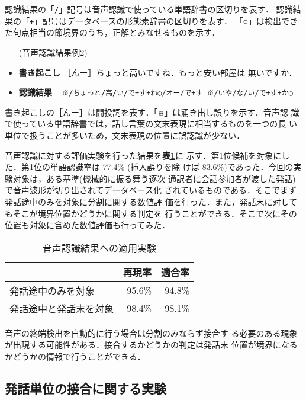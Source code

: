 認識結果の「{\tt /}」記号は音声認識で使っている単語辞書の区切りを表す．
認識結果の「{\tt +}」記号はデータベースの形態素辞書の区切りを表す．
「○」は検出できた句点相当の節境界のうち，正解とみなせるものを示す．

\begin{itemize}
\item[(音声認識結果例2)]
\item {\bf\dg 書き起こし} ［んー］ちょっと高いですね．もっと安い部屋は
無いですか．
\item {\bf\dg 認識結果} {\tt 二※/ちょっと/高/い/で+す+ね○/オー/で+す
※/いや/な/い/で+す+か○}
\end{itemize}

書き起こしの［んー］は間投詞を表す．「※」は涌き出し誤りを示す．音声認
識で使っている単語辞書では，話し言葉の文末表現に相当するものを一つの長
い単位で扱うことが多いため，文末表現の位置に誤認識が少ない．

音声認識に対する評価実験を行った結果を{\bf\dg 表\ref{t:recognition}}に
示す．第1位候補を対象にした．第1位の単語認識率は 77.4\% (挿入誤りを除
けば 83.6\%)であった．今回の実験対象は，ある基準(機械的に振る舞う逐次
通訳者に会話参加者が渡した発話)で音声波形が切り出されてデータベース化
されているものである．そこでまず発話途中のみを対象に分割に関する数値評
価を行った．また，発話末に対してもそこが境界位置かどうかに関する判定を
行うことができる．そこで次にその位置も対象に含めた数値評価も行ってみた．

\begin{table}
\caption{音声認識結果への適用実験}\label{t:recognition}
\begin{center}
\begin{tabular}{|l||r|r|}
\hline
 & \multicolumn{1}{c|}{再現率} & \multicolumn{1}{c|}{適合率} \\
\hline\hline
発話途中のみを対象     & 95.6\% & 94.8\% \\
\hline
発話途中と発話末を対象 & 98.4\% & 98.1\% \\
\hline
\end{tabular}
\end{center}
\end{table}

音声の終端検出を自動的に行う\cite{Reaves98}場合は分割のみならず接合す
る必要のある現象が出現する可能性がある．接合するかどうかの判定は発話末
位置が境界になるかどうかの情報で行うことができる．

\subsection{発話単位の接合に関する実験}

